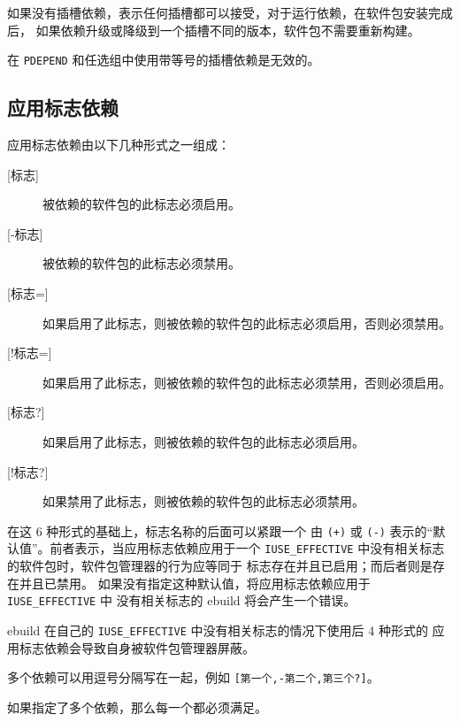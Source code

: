 如果没有插槽依赖，表示任何插槽都可以接受，对于运行依赖，在软件包安装完成后，
如果依赖升级或降级到一个插槽不同的版本，软件包不需要重新构建。

在 \texttt{PDEPEND} 和任选组中使用带等号的插槽依赖是无效的。

\subsection{应用标志依赖}
\label{sec:use-dep}

应用标志依赖由以下几种形式之一组成：
\begin{description}
\item[{[标志]}] 被依赖的软件包的此标志必须启用。
\item[{[-标志]}] 被依赖的软件包的此标志必须禁用。
\item[{[标志\hspace{0em}=]}] 如果启用了此标志，则被依赖的软件包的此标志必须启用，否则必须禁用。
\item[{[!\hspace{0em}标志\hspace{0em}=]}] 如果启用了此标志，则被依赖的软件包的此标志必须禁用，否则必须启用。
\item[{[标志?]}] 如果启用了此标志，则被依赖的软件包的此标志必须启用。
\item[{[!\hspace{0em}标志?]}] 如果禁用了此标志，则被依赖的软件包的此标志必须禁用。
\end{description}

在这 6 种形式的基础上，标志名称的后面可以紧跟一个
由 \texttt{(+)} 或 \texttt{(-)} 表示的“默认值”。前者表示，当应用标志依赖应用于一个
\texttt{IUSE_EFFECTIVE} 中没有相关标志的软件包时，软件包管理器的行为应等同于
标志存在并且已启用；而后者则是存在并且已禁用。
如果没有指定这种默认值，将应用标志依赖应用于 \texttt{IUSE_EFFECTIVE} 中
没有相关标志的 ebuild 将会产生一个错误。

ebuild 在自己的 \texttt{IUSE_EFFECTIVE} 中没有相关标志的情况下使用后 4 种形式的
应用标志依赖会导致自身被软件包管理器屏蔽。

多个依赖可以用逗号分隔写在一起，例如 \texttt{[第一个,-第二个,\hspace{0em}第三个?]}。

如果指定了多个依赖，那么每一个都必须满足。



